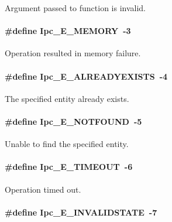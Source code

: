 Argument passed to function is invalid. 

\paragraph[{Ipc\_\-E\_\-MEMORY}]{\setlength{\rightskip}{0pt plus 5cm}\#define Ipc\_\-E\_\-MEMORY~-\/3}\hfill\label{_ipc_8h_a55c40b7f048ac0aaf3b2836101c9dc81}


Operation resulted in memory failure. 

\paragraph[{Ipc\_\-E\_\-ALREADYEXISTS}]{\setlength{\rightskip}{0pt plus 5cm}\#define Ipc\_\-E\_\-ALREADYEXISTS~-\/4}\hfill\label{_ipc_8h_a31205e4f4d3cc31cc615926d466e920b}


The specified entity already exists. 

\paragraph[{Ipc\_\-E\_\-NOTFOUND}]{\setlength{\rightskip}{0pt plus 5cm}\#define Ipc\_\-E\_\-NOTFOUND~-\/5}\hfill\label{_ipc_8h_ab511d4936c15fb4ad724a6c457af45a2}


Unable to find the specified entity. 

\paragraph[{Ipc\_\-E\_\-TIMEOUT}]{\setlength{\rightskip}{0pt plus 5cm}\#define Ipc\_\-E\_\-TIMEOUT~-\/6}\hfill\label{_ipc_8h_a5ec546ed4e07fc5d8215ebdf8fee65d0}


Operation timed out. 

\paragraph[{Ipc\_\-E\_\-INVALIDSTATE}]{\setlength{\rightskip}{0pt plus 5cm}\#define Ipc\_\-E\_\-INVALIDSTATE~-\/7}\hfill\label{_ipc_8h_acebc3658919077d62e56e7e88247fa22}


